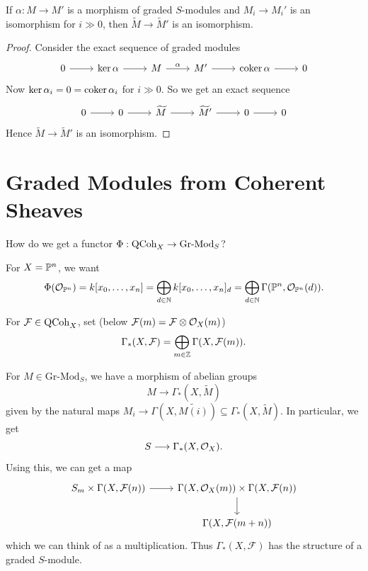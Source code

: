 \begin{corollary}
  If $\alpha : M \to M'$ is a morphism of graded
  $S$-modules and $M_i \to M_i'$ is an
  isomorphism for $i \gg 0$, then
  $\widetilde{M} \to \widetilde{M}'$
  is an isomorphism.
\end{corollary}

\begin{proof}
  Consider the exact sequence of graded
  modules
  \[
    \begin{tikzcd}
      0 \ar[r] & \ker \alpha \ar[r] & M \ar[r, "\alpha"] & M' \ar[r] & \coker \alpha \ar[r] & 0
    \end{tikzcd}
  \]
  Now $\ker \alpha_i = 0 = \operatorname{coker} \alpha_i$
  for $i \gg 0$. So we get an exact sequence
  \[
    \begin{tikzcd}
      0 \ar[r] & 0 \ar[r] & \widetilde{M} \ar[r] & \widetilde{M}' \ar[r] & 0 \ar[r] & 0
    \end{tikzcd}
  \]
  Hence $\widetilde{M} \to \widetilde{M}'$
  is an isomorphism.
\end{proof}

\section{Graded Modules from Coherent Sheaves}

\begin{remark}
  How do we get a functor
  $\Phi : \operatorname{QCoh}_X \to \mathrm{Gr}\text{-}\mathrm{Mod}_S$?
\end{remark}

\begin{example}
   For $X = \mathbb{P}^n$, we want
   \[
     \Phi(\mathcal{O}_{\mathbb{P}^n})
     = k[x_0, \dots, x_n]
     = \bigoplus_{d \in \mathbb{N}} k[x_0, \dots, x_n]_d
     = \bigoplus_{d \in \mathbb{N}} \Gamma(\mathbb{P}^n, \mathcal{O}_{\mathbb{P}^n}(d)).
   \]
\end{example}

\begin{definition}
  For $\mathcal{F} \in \operatorname{QCoh}_X$, set
  (below $\mathcal{F}(m) = \mathcal{F} \otimes \mathcal{O}_X(m)$)
  \[
    \Gamma_*(X, \mathcal{F}) = \bigoplus_{m \in \mathbb{Z}} \Gamma(X, \mathcal{F}(m)).
  \]
\end{definition}

\begin{remark}
  For $M \in \mathrm{Gr}\text{-}\mathrm{Mod}_S$,
  we have a morphism of abelian groups
  \[
    M \longrightarrow
    \Gamma_*(X, \widetilde{M})
  \]
  given by the natural maps
  $M_i \to \Gamma(X, \widetilde{M(i)}) \subseteq \Gamma_*(X, \widetilde{M})$.
  In particular, we get
  \[
    S \longrightarrow \Gamma_*(X, \mathcal{O}_X).
  \]
  Using this, we can get a map
  \[
    \begin{tikzcd}
    S_m \times \Gamma(X, \mathcal{F}(n))
    \ar[r] & \Gamma(X, \OO_X(m)) \times \Gamma(X, \mathcal{F}(n)) \ar[d] \\
    & \Gamma(X, \mathcal{F}(m + n))
    \end{tikzcd}
  \]
  which we can think of as a
  multiplication. Thus
  $\Gamma_*(X, \mathcal{F})$ has the
  structure of a graded $S$-module.
\end{remark}

